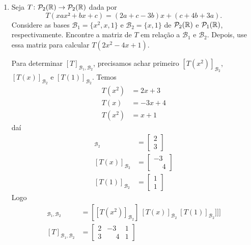 \begin{exemplos}
\begin{enumerate}[label={\arabic*})]
        \item Seja $T \colon \mathcal{P}_2(\mathbb{R}) \to \mathcal{P}_2(\mathbb{R})$ dada por
        \[
            T(xax² + bx + c) = (2a + c - 3b)x + (c + 4b + 3a).
        \]
        Considere as bases $\mathcal{B}_1 = \{x^2, x, 1\}$ e $\mathcal{B}_2 = \{x, 1\}$ de $\mathcal{P}_2(\mathbb{R})$ e $\mathcal{P}_1(\mathbb{R})$, respectivamente. Encontre a matriz de $T$ em relação a $\mathcal{B}_1
        $ e $\mathcal{B}_2$. Depois, use essa matriz para calcular $T(2x^2 - 4x + 1)$.
        \begin{solucao}
            Para determinar $[T]_{\mathcal{B}_1, \mathcal{B}_2}$, precisamos achar primeiro $[T(x^2)]_{\mathcal{B}_2}$, $[T(x)]_{\mathcal{B}_2}$ e $[T(1)]_{\mathcal{B}_2}$.
            Temos
            \begin{align*}
              T(x^2) &= 2x + 3\\
                T(x) &= -3x + 4\\
                T(x^2) &= x + 1
            \end{align*}
            daí
            \begin{align*}
                [T(x^2)]_{\mathcal{B}_2} &= \begin{bmatrix}2\\3\end{bmatrix}\\
                [T(x)]_{\mathcal{B}_2} &= \begin{bmatrix}-3\\\phantom{-}4\end{bmatrix}\\
                [T(1)]_{\mathcal{B}_2} &= \begin{bmatrix}1\\1\end{bmatrix}
            \end{align*}
            Logo
            \begin{align*}
                [T]_{\mathcal{B}_1, \mathcal{B}_2} &= [[T(x^2)]_{\mathcal{B}_2}]\ [T(x)]_{\mathcal{B}_2}\ [T(1)]_{\mathcal{B}_2}]]]\\
                [T]_{\mathcal{B}_1, \mathcal{B}_2} &= \begin{bmatrix}2 & -3 & 1\\3 & \phantom{-}4 & 1\end{bmatrix}
            \end{align*}


\end{solucao}
\end{enumerate}
\end{exemplos}
